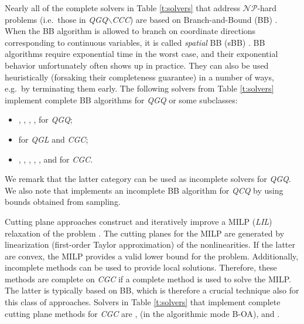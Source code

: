 Nearly all of the complete solvers in Table \ref{t:solvers} that address $\mathcal{NP}$-hard problems (i.e.~those in \textit{QGQ}$\smallsetminus$\textit{CCC}) are based on Branch-and-Bound (BB) \cite{land_doig}. When the BB algorithm is allowed to branch on coordinate directions corresponding to continuous variables, it is called \emph{spatial} BB (sBB) \cite{dakin,couenne}. BB algorithms require exponential time in the worst case, and their exponential behavior unfortunately often shows up in practice. They can also be used heuristically (forsaking their completeness guarantee) in a number of ways, e.g.~by terminating them early. The following solvers from Table \ref{t:solvers} implement complete BB algorithms for \textit{QGQ} or some subclasses: 
%
\begin{itemize}
 \item \antigone, \baron, \couenne, \lindo, \scip for \textit{QGQ};
\item \cplex for \textit{QGL} and \textit{CGC};
%
 \item \knitro, \bonmin, \sbb, \xpress, \gurobi, and \mosek for \textit{CGC}.
\end{itemize}
%
We remark that the latter category can be used as incomplete solvers for \textit{QGQ}. We also note that \lgo implements an incomplete BB algorithm for \textit{QCQ} by using bounds obtained from sampling.

Cutting plane approaches construct and iteratively improve a MILP (\textit{LIL}) relaxation of the problem \cite{DuGr86,WePoe02}. The cutting planes for the MILP are generated by linearization (first-order Taylor approximation) of the nonlinearities. If the latter are convex, the MILP provides a valid lower bound for the problem. Additionally, incomplete methods can be used to provide local solutions. Therefore, these methods are complete on \textit{CGC} if a complete method is used to solve the MILP. The latter is typically based on BB, which is therefore a crucial technique also for this class of approaches. Solvers in Table \ref{t:solvers} that implement complete cutting plane methods for \textit{CGC} are \alphaecp, \bonmin (in the algorithmic mode B-OA), and \dicopt.

